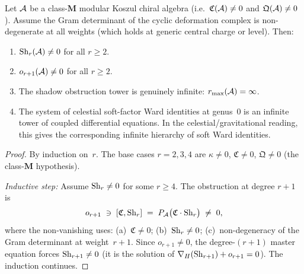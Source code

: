 \begin{proposition}
Let $\mathcal{A}$ be a class-$\mathbf{M}$ modular Koszul chiral algebra
(i.e.\ $\mathfrak{C}(\mathcal{A}) \neq 0$ and $\mathfrak{Q}(\mathcal{A}) \neq 0$).
Assume the Gram determinant of the cyclic deformation complex is
non-degenerate at all weights (which holds at generic central
charge or level). Then:
\begin{enumerate}[label=\textup{(\roman*)}]
\item $\operatorname{Sh}_r(\mathcal{A}) \neq 0$ for all $r \geq 2$.
\item $o_{r+1}(\mathcal{A}) \neq 0$ for all $r \geq 2$.
\item The shadow obstruction tower is genuinely infinite:
 $r_{\max}(\mathcal{A}) = \infty$.
\item The system of celestial soft-factor Ward identities at genus~$0$
 is an infinite tower of coupled differential equations. In the
 celestial/gravitational reading, this gives the corresponding
 infinite hierarchy of soft Ward identities.
\end{enumerate}
\end{proposition}

\begin{proof}
By induction on~$r$. The base cases $r = 2, 3, 4$ are
$\kappa \neq 0$, $\mathfrak{C} \neq 0$, $\mathfrak{Q} \neq 0$
(the class-$\mathbf{M}$ hypothesis).

\emph{Inductive step:} Assume $\operatorname{Sh}_r \neq 0$ for some $r \geq 4$.
The obstruction at degree $r+1$ is
\[
o_{r+1}
\;\ni\;
[\mathfrak{C}, \operatorname{Sh}_r]
\;=\;
P_{\mathcal{A}}\bigl(\mathfrak{C} \cdot \operatorname{Sh}_r\bigr)
\;\neq\; 0,
\]
where the non-vanishing uses: (a)~$\mathfrak{C} \neq 0$;
(b)~$\operatorname{Sh}_r \neq 0$; (c)~non-degeneracy of the Gram determinant
at weight~$r+1$.
Since $o_{r+1} \neq 0$, the degree-$(r+1)$ master equation
forces $\operatorname{Sh}_{r+1} \neq 0$ (it is the solution of
$\nabla_H(\operatorname{Sh}_{r+1}) + o_{r+1} = 0$). The induction continues.
\end{proof}

